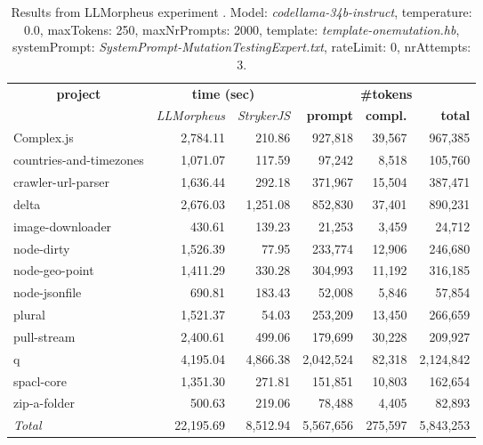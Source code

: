 
\begin{table*}[hbt!]
\centering
{\scriptsize
\begin{tabular}{l||r|r|r|r|r}
\multicolumn{1}{c|}{\bf project} & \multicolumn{2}{|c|}{\bf time (sec)} & \multicolumn{3}{|c|}{\bf \#tokens} \\
               & {\it LLMorpheus} & {\it StrykerJS} & {\bf prompt} & {\bf compl.} & {\bf total} \\
\hline
  Complex.js & 2,784.11 & 210.86 & 927,818 & 39,567 & 967,385 \\ 
countries-and-timezones & 1,071.07 & 117.59 & 97,242 & 8,518 & 105,760 \\ 
crawler-url-parser & 1,636.44 & 292.18 & 371,967 & 15,504 & 387,471 \\ 
delta & 2,676.03 & 1,251.08 & 852,830 & 37,401 & 890,231 \\ 
image-downloader & 430.61 & 139.23 & 21,253 & 3,459 & 24,712 \\ 
node-dirty & 1,526.39 & 77.95 & 233,774 & 12,906 & 246,680 \\ 
node-geo-point & 1,411.29 & 330.28 & 304,993 & 11,192 & 316,185 \\ 
node-jsonfile & 690.81 & 183.43 & 52,008 & 5,846 & 57,854 \\ 
plural & 1,521.37 & 54.03 & 253,209 & 13,450 & 266,659 \\ 
pull-stream & 2,400.61 & 499.06 & 179,699 & 30,228 & 209,927 \\ 
q & 4,195.04 & 4,866.38 & 2,042,524 & 82,318 & 2,124,842 \\ 
spacl-core & 1,351.30 & 271.81 & 151,851 & 10,803 & 162,654 \\ 
zip-a-folder & 500.63 & 219.06 & 78,488 & 4,405 & 82,893 \\ 
\hline
  \textit{Total} & 22,195.69 & 8,512.94 & 5,567,656 & 275,597 & 5,843,253 \\
  \end{tabular}
  }
  \\[2mm]
  \caption{Results from LLMorpheus experiment .
    Model: \textit{codellama-34b-instruct}, 
    temperature: 0.0, 
    maxTokens: 250, 
    maxNrPrompts: 2000, 
    template: \textit{template-onemutation.hb}, 
    systemPrompt: \textit{SystemPrompt-MutationTestingExpert.txt}, 
    rateLimit: 0, 
    nrAttempts: 3.  
  }
  \label{table:Cost:run365:codellama-34b-instruct:template-onemutation.hb:0.0}
\end{table*}